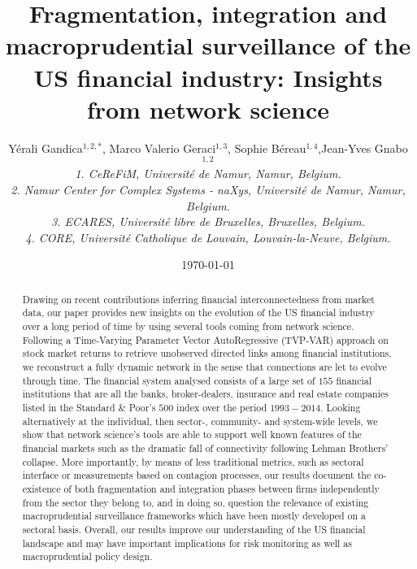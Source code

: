 \documentclass[a4paper,10pt]{article}
\begin{document}
\title{Fragmentation, integration and macroprudential surveillance of the US financial industry: Insights from network science}

\author{Y\'{e}rali Gandica$^{1,2,\ast}$, Marco Valerio Geraci$^{1,3}$, Sophie B\'ereau$^{1,4}$,Jean-Yves Gnabo$^{1,2}$ \\
\emph{1. CeReFiM, Universit\' e de Namur, Namur, Belgium. } \\
\emph{2. Namur Center for Complex Systems - naXys, Universit\' e de Namur, Namur, Belgium.} \\ 
\emph{3. ECARES, Universit\'{e} libre de Bruxelles, Bruxelles, Belgium.} \\
\emph{4. CORE, Universit\'{e} Catholique de Louvain, Louvain-la-Neuve, Belgium.} \\
}
\date{\today}

\maketitle
\singlespacing
\begin{abstract}

Drawing on recent contributions inferring financial interconnectedness from market data, our paper provides new insights on 
the evolution of the US financial industry over a long period of time by using several tools coming from network science. 
Following \cite{Geraci} a Time-Varying Parameter Vector AutoRegressive (TVP-VAR) approach on stock market returns to retrieve unobserved 
directed links among financial institutions, we reconstruct a fully dynamic network in the sense that connections are let to 
evolve through time. The financial system analysed consists of a large set of $155$ financial institutions that are all the banks,
broker-dealers, insurance and real estate companies listed in the Standard \& Poor's $500$ index over the period $1993 - 2014$. Looking
alternatively at the individual, then sector-, community- and system-wide levels, we show that network science’s tools are able 
to support well known features of the financial markets such as the dramatic fall of connectivity following Lehman Brothers’ 
collapse. More importantly, by means of less traditional metrics, such as sectoral interface or measurements based on contagion 
processes, our results document the co-existence of both fragmentation and integration phases between firms independently from the
sector they belong to, and in doing so, question the relevance of existing macroprudential surveillance frameworks which have been
mostly developed on a sectoral basis.
Overall, our results improve our understanding of the US financial landscape and may have important implications for risk monitoring
as well as macroprudential policy design.
\end{abstract}
\end{document}
